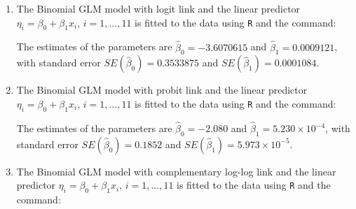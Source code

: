 \begin{solution}{5.9}
\begin{enumerate}
\item The Binomial GLM model with logit link and the linear predictor $\eta_{i}=\beta_{0}+\beta_{1}x_{i}$, $i=1,...,11$ is fitted to the data using \texttt{R} and the command:
\begin{knitrout}
\color{fgcolor}\begin{kframe}
\begin{alltt}
\hlstd{(}\hlopt{-}\hlopt{~}
\end{alltt}
\end{kframe}
\end{knitrout}

The estimates of the parameters are $\hat{\beta}_{0}=-3.6070615$ and $\hat{\beta}_{1}=0.0009121$, with standard error $SE(\hat{\beta}_{0})=0.3533875$ and $SE(\hat{\beta}_{1})=0.0001084$.

\item The Binomial GLM model with probit link and the linear predictor $\eta_{i}=\beta_{0}+\beta_{1}x_{i}$, $i=1,...,11$ is fitted to the data using \texttt{R} and the command:
\begin{knitrout}
\color{fgcolor}\begin{kframe}
\begin{alltt}
\hlstd{(}\hlopt{-}\hlopt{~}\hlstd{=}\hlstd{(}
\end{alltt}
\end{kframe}
\end{knitrout}

The estimates of the parameters are $\hat{\beta}_{0}=-2.080$ and $\hat{\beta}_{1}=5.230\times10^{-4}$, with standard error $SE(\hat{\beta}_{0})=0.1852$ and $SE(\hat{\beta}_{1})=5.973\times10^{-5}$.

\item The Binomial GLM model with complementary log-log link and the linear predictor $\eta_{i}=\beta_{0}+\beta_{1}x_{i}$, $i=1,...,11$ is fitted to the data using \texttt{R} and the command:
\begin{knitrout}
\color{fgcolor}\begin{kframe}
\begin{alltt}
\hlstd{(}\hlopt{-}\hlopt{~}\hlstd{=}\hlstd{(}
\end{alltt}
\end{kframe}
\end{knitrout}


\end{enumerate}
\end{solution}
